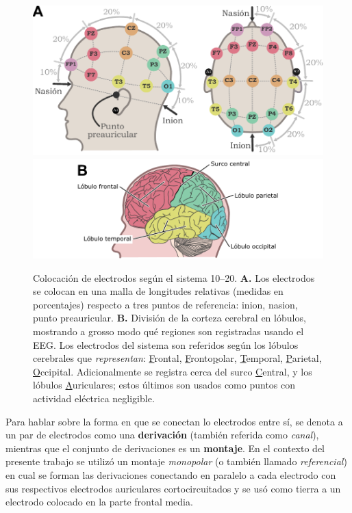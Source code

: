 \documentclass[12pt,letterpaper]{book}
\begin{document}
\begin{figure}
\centering
\includegraphics[width=\linewidth]{./img_diagramas/cabeza_proporcionada_color_v4.pdf} 
\includegraphics[width=\linewidth]{./img_diagramas/cerebro_1020_v5.pdf} 
\caption[Colocación de electrodos para EEG según el sistema 10--20]{Colocación de electrodos según el sistema 10--20. \textbf{A.} Los electrodos se colocan en una malla de longitudes relativas (medidas en porcentajes) respecto a tres puntos de referencia: inion, nasion, punto preauricular.
\textbf{B.} División de la corteza cerebral en lóbulos, mostrando a grosso modo qué regiones son registradas usando el EEG. Los electrodos del sistema son referidos según los lóbulos cerebrales que \textit{representan}: \underline{F}rontal, \underline{F}ronto\underline{p}olar, \underline{T}emporal, \underline{P}arietal, \underline{O}ccipital. Adicionalmente se registra cerca del surco \underline{C}entral, y los lóbulos \underline{A}uriculares; estos últimos son usados como puntos con actividad eléctrica negligible.
}
\label{img1020}
\end{figure}

Para hablar sobre la forma en que se conectan lo electrodos entre sí, se denota a un par de electrodos como una \textbf{derivación} (también referida como \textit{canal}), mientras que el conjunto de derivaciones es un \textbf{montaje}.
%
En el contexto del presente trabajo se utilizó un montaje \textit{monopolar} (o también llamado \textit{referencial}) en cual se forman las derivaciones conectando en paralelo a cada electrodo con sus respectivos electrodos auriculares cortocircuitados y se usó como tierra a un electrodo colocado en la parte frontal media.
\end{document}
